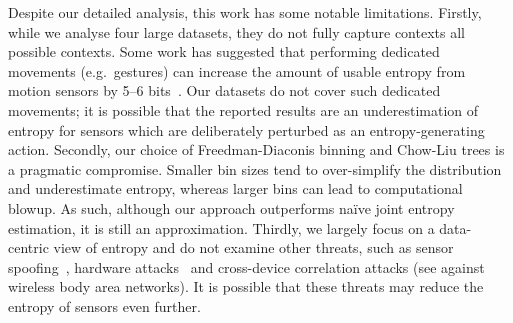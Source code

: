 Despite our detailed analysis, this work has some notable limitations. Firstly, while we analyse four large datasets, they do not fully capture contexts all possible contexts. Some work has suggested that performing dedicated movements (e.g.\ gestures) can increase the amount of usable entropy from motion sensors by 5--6 bits~\cite{lv2020analysis,voris2011accelerometers}. Our datasets do not cover such dedicated movements; it is possible that the reported results are an underestimation of entropy for sensors which are deliberately perturbed as an entropy-generating action. Secondly, our choice of Freedman-Diaconis binning and Chow-Liu trees is a pragmatic compromise. Smaller bin sizes tend to over-simplify the distribution and underestimate entropy, whereas larger bins can lead to computational blowup. As such, although our approach outperforms na\"{i}ve joint entropy estimation, it is still an approximation.  Thirdly, we largely focus on a data-centric view of entropy and do not examine other threats, such as sensor spoofing~\cite{shrestha2018sensor}, hardware attacks~\cite{shepherd2021physical} and cross-device correlation attacks (see \cite{dautov2019effects} against wireless body area networks). It is possible that these threats may reduce the entropy of sensors even further.

